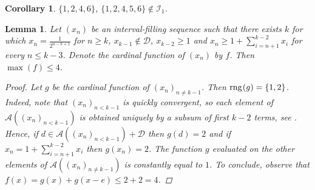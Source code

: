 \documentclass{amsart}
\newtheorem{lemma}[theorem]{Lemma}
\newtheorem{corollary}[theorem]{Corollary}
\theoremstyle{definition}
\newcommand{\rng}{{\rm rng} \hspace{0.03cm}}
\begin{document}
\begin{corollary}
$\{1,2,4,6\}$, $\{1,2,4,5,6\}\notin \mathcal{I}_1$.
\end{corollary}

\begin{lemma}\label{codolozycdoniedwojkowowymiernej}
Let $(x_n)$ be an interval-filling sequence such that there exists $k$ for which $x_n=\frac{1}{2^{n-k+1}}$ for $n\geq k$, $x_{k-1}\notin \mathcal{D}$, $x_{k-2}\geq 1$ and $x_n\geq 1+\sum_{i=n+1}^{k-2}x_i$ for every $n\leq k-3$. Denote the cardinal function of $(x_n)$ by $f$. Then $\max(f)\leq 4$. 
\begin{proof}
Let $g$ be the cardinal function of $(x_n)_{n\neq k-1}$. Then $\rng(g)=\{1,2\}$. Indeed, note that $(x_n)_{n<k-1}$ is quickly convergent, so each element of $\mathcal{A}((x_n)_{n<k-1})$ is obtained uniquely by a subsum of first $k-2$ terms, see \cite[Proposition 3.1]{cardfun}. Hence, if $d\in \mathcal{A}((x_n)_{n<k-1})+\mathcal{D}$ then $g(d)=2$ and if $x_n=1+\sum_{i=n+1}^{k-2}x_i$ then $g(x_n)=2$. The function $g$ evaluated on the other elements of $\mathcal{A}((x_n)_{n\neq k-1})$ is constantly equal to $1$. To conclude, observe that $f(x)=g(x)+g(x-e)\leq 2+2=4$. 
\end{proof}
\end{lemma}
\end{document}
